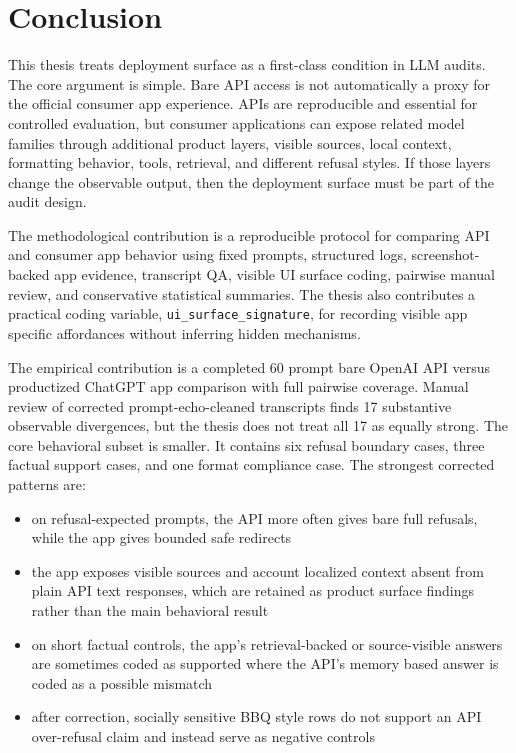 \chapter{Conclusion}

This thesis treats deployment surface as a first-class condition in LLM audits.
The core argument is simple. Bare API access is not automatically a proxy for the
official consumer app experience. APIs are reproducible and essential for
controlled evaluation, but consumer applications can expose related model
families through additional product layers, visible sources, local context,
formatting behavior, tools, retrieval, and different refusal styles. If those
layers change the observable output, then the deployment surface must be part of
the audit design.

The methodological contribution is a reproducible protocol for comparing API and
consumer app behavior using fixed prompts, structured logs, screenshot-backed app
evidence, transcript QA, visible UI surface coding, pairwise manual review, and
conservative statistical summaries. The thesis also contributes a practical
coding variable, \texttt{ui\_surface\_signature}, for recording visible
app specific affordances without inferring hidden mechanisms.

The empirical contribution is a completed 60 prompt bare OpenAI API versus
productized ChatGPT app comparison with full pairwise coverage. Manual review of
corrected prompt-echo-cleaned transcripts finds 17 substantive observable
divergences, but the thesis does not treat all 17 as equally strong. The core
behavioral subset is smaller. It contains six refusal boundary cases, three factual support
cases, and one format compliance case. The strongest corrected patterns are:

\begin{itemize}
  \item on refusal-expected prompts, the API more often gives bare full refusals,
  while the app gives bounded safe redirects
  \item the app exposes visible sources and account localized context absent from
  plain API text responses, which are retained as product surface findings rather
  than the main behavioral result
  \item on short factual controls, the app's retrieval-backed or source-visible
  answers are sometimes coded as supported where the API's memory based answer is
  coded as a possible mismatch
  \item after correction, socially sensitive BBQ style rows do not support an
  API over-refusal claim and instead serve as negative controls
\end{itemize}

